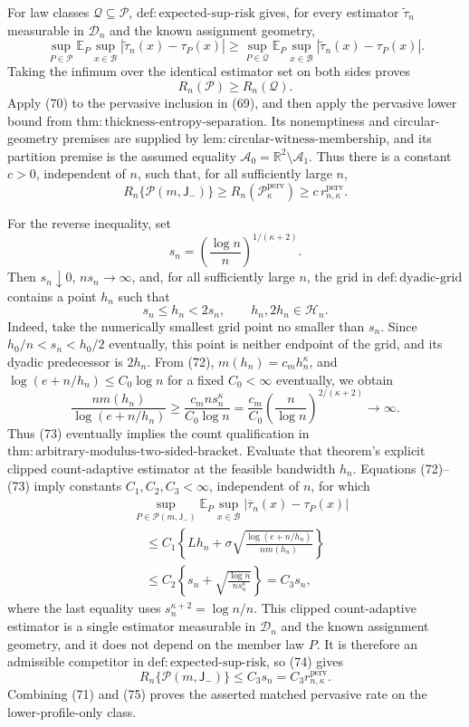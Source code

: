 For law classes \(\mathcal Q\subseteq\mathcal P\), \(\mathrm{def:expected\text{-}sup\text{-}risk}\) gives, for every estimator \(\widetilde\tau_n\) measurable in \(\mathcal D_n\) and the known assignment geometry,
\[
 \sup_{P\in\mathcal P}\mathbb E_P\sup_{x\in\mathcal B}
 |\widetilde\tau_n(x)-\tau_P(x)|
 \ge
 \sup_{P\in\mathcal Q}\mathbb E_P\sup_{x\in\mathcal B}
 |\widetilde\tau_n(x)-\tau_P(x)|.
\]
Taking the infimum over the identical estimator set on both sides proves
\[
 R_n(\mathcal P)\ge R_n(\mathcal Q). \tag{70}
\]
Apply (70) to the pervasive inclusion in (69), and then apply the pervasive lower bound from \(\mathrm{thm:thickness\text{-}entropy\text{-}separation}\). Its nonemptiness and circular-geometry premises are supplied by \(\mathrm{lem:circular\text{-}witness\text{-}membership}\), and its partition premise is the assumed equality \(\mathcal A_0=\mathbb R^2\setminus\mathcal A_1\). Thus there is a constant \(c>0\), independent of \(n\), such that, for all sufficiently large \(n\),
\[
 R_n\{\mathcal P(m,\mathsf J_{-})\}
 \ge R_n(\mathcal P_\kappa^{\mathrm{perv}})
 \ge c\,r_{n,\kappa}^{\mathrm{perv}}. \tag{71}
\]

For the reverse inequality, set
\[
 s_n=\left(\frac{\log n}{n}\right)^{1/(\kappa+2)}.
\]
Then \(s_n\downarrow0\), \(ns_n\to\infty\), and, for all sufficiently large \(n\), the grid in \(\mathrm{def:dyadic\text{-}grid}\) contains a point \(h_n\) such that
\[
 s_n\le h_n<2s_n,
 \qquad h_n,2h_n\in\mathcal H_n. \tag{72}
\]
Indeed, take the numerically smallest grid point no smaller than \(s_n\). Since \(h_0/n<s_n<h_0/2\) eventually, this point is neither endpoint of the grid, and its dyadic predecessor is \(2h_n\). From (72), \(m(h_n)=c_mh_n^\kappa\), and \(\log(e+n/h_n)\le C_0\log n\) for a fixed \(C_0<\infty\) eventually, we obtain
\[
 \frac{nm(h_n)}{\log(e+n/h_n)}
 \ge\frac{c_mns_n^\kappa}{C_0\log n}
 =\frac{c_m}{C_0}
 \left(\frac n{\log n}\right)^{2/(\kappa+2)}
 \longrightarrow\infty. \tag{73}
\]
Thus (73) eventually implies the count qualification in \(\mathrm{thm:arbitrary\text{-}modulus\text{-}two\text{-}sided\text{-}bracket}\). Evaluate that theorem's explicit clipped count-adaptive estimator at the feasible bandwidth \(h_n\). Equations (72)--(73) imply constants \(C_1,C_2,C_3<\infty\), independent of \(n\), for which
\[
 \begin{aligned}
 &\sup_{P\in\mathcal P(m,\mathsf J_{-})}
 \mathbb E_P\sup_{x\in\mathcal B}
 |\overline\tau_n(x)-\tau_P(x)|\\
 &\quad\le C_1\left\{Lh_n+
 \sigma\sqrt{\frac{\log(e+n/h_n)}{nm(h_n)}}\right\}\\
 &\quad\le C_2\left\{s_n+
 \sqrt{\frac{\log n}{ns_n^\kappa}}\right\}
 =C_3s_n,
 \end{aligned} \tag{74}
\]
where the last equality uses \(s_n^{\kappa+2}=\log n/n\). This clipped count-adaptive estimator is a single estimator measurable in \(\mathcal D_n\) and the known assignment geometry, and it does not depend on the member law \(P\). It is therefore an admissible competitor in \(\mathrm{def:expected\text{-}sup\text{-}risk}\), so (74) gives
\[
 R_n\{\mathcal P(m,\mathsf J_{-})\}
 \le C_3s_n
 =C_3r_{n,\kappa}^{\mathrm{perv}}. \tag{75}
\]
Combining (71) and (75) proves the asserted matched pervasive rate on the lower-profile-only class.

